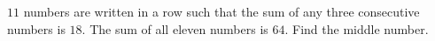 $11$ numbers are written in a row such that the sum of any three consecutive numbers is $18$. The sum of all eleven numbers is $64$. Find the middle number.
